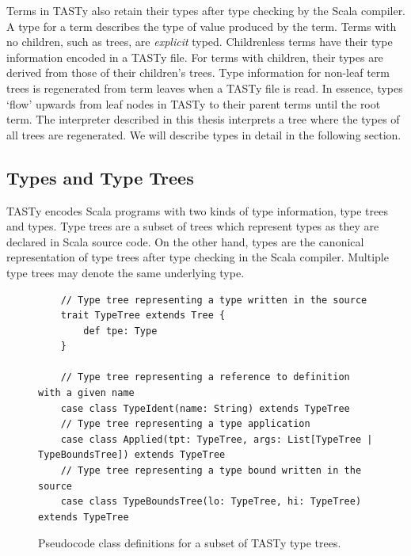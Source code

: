 Terms in TASTy also retain their types after type checking by the Scala compiler.
A type for a term describes the type of value produced by the term.
Terms with no children, such as  trees, are \textit{explicit} typed.
Childrenless terms have their type information encoded in a TASTy file.  
For terms with children, their types are derived from those of their children's trees.
Type information for non-leaf term trees is regenerated from term leaves when a TASTy file is read.
In essence, types `flow' upwards from leaf nodes in TASTy to their parent terms until the root term.
The interpreter described in this thesis interprets a tree where the types of all trees are regenerated.
We will describe types in detail in the following section.

\subsection{Types and Type Trees}

TASTy encodes Scala programs with two kinds of type information, type trees and types.
Type trees are a subset of trees which represent types as they are declared in Scala source code.
On the other hand, types are the canonical representation of type trees after type checking in the Scala compiler.
Multiple type trees may denote the same underlying type.

\begin{figure}[!htb]
	\begin{verbatim}
	// Type tree representing a type written in the source
	trait TypeTree extends Tree {
		def tpe: Type
	}
	
	// Type tree representing a reference to definition with a given name
	case class TypeIdent(name: String) extends TypeTree 
	// Type tree representing a type application
	case class Applied(tpt: TypeTree, args: List[TypeTree | TypeBoundsTree]) extends TypeTree
	// Type tree representing a type bound written in the source
	case class TypeBoundsTree(lo: TypeTree, hi: TypeTree) extends TypeTree
	\end{verbatim} 
	\caption{Pseudocode class definitions for a subset of TASTy type trees.}
	\label{tasty:type-trees}
\end{figure}

